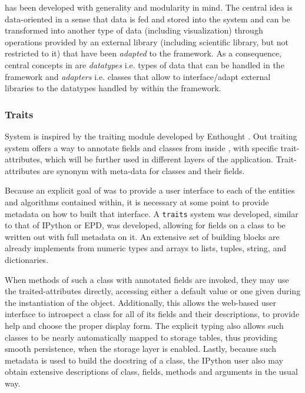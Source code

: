 \TVB has been developed with generality and modularity in mind. The central idea is data-oriented in a sense that
data is fed and stored into the system and can be transformed into another type
of data (including visualization) through operations provided by an external
library (including \TVB scientific library, but not restricted to it) that have
been \emph{adapted} to the framework. As a consequence, central concepts in \TVB
are \emph{datatypes} i.e. types of data that can be handled in the framework and
\emph{adapters} i.e. classes that allow to interface/adapt external libraries
to  the datatypes handled by within the framework.

	\subsubsection{\TVB Traits}

System is inspired by the traiting module developed by Enthought \cite{Enthought_2001}.
Out traiting system offers a way to annotate fields and classes from inside \TVB, with specific trait-attributes,
which will be further used in different layers of the application.
Trait-attributes are synonym with meta-data for \TVB classes and their fields.

Because an explicit goal of \TVB was to provide a user interface to each of the
entities and algorithms contained within, it is necessary at some point to
provide metadata on how to built that interface. A \texttt{traits} system was developed, similar to that of
IPython or EPD, was developed, allowing for fields on a \TVB class to
be written out with full metadata on it. An extensive set of  building 
blocks are already implements from numeric types and arrays to lists, tuples, 
string, and dictionaries.

 When methods of such a class with annotated fields are invoked,
they may use the traited-attributes directly, accessing either a default value
or one given during the instantiation of the object. Additionally, this allows
the web-based user interface to introspect a class for all of its fields and their
descriptions, to provide help and choose the proper display form. The explicit typing also allows
such classes to be nearly automatically mapped to storage tables,
thus providing smooth persistence, when the storage layer is enabled.  
Lastly, because such metadata is used to build the docstring of a class,
the IPython user also may obtain extensive descriptions of class, fields, methods and
arguments in the usual way. 

